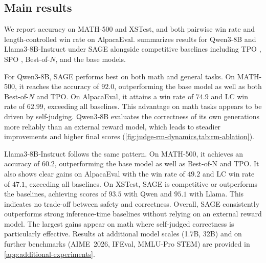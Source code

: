 \documentclass[11pt]{article}
\theoremstyle{plain}
\theoremstyle{definition}
\theoremstyle{remark}
\newcommand{\method}{SAGE}
\begin{document}
\subsection{Main results}
\noindent We report accuracy on MATH-500 and XSTest, and both pairwise win rate and length-controlled win rate on AlpacaEval.  summarizes results for Qwen3-8B and Llama3-8B-Instruct under \method{} alongside competitive baselines including TPO \citep{litest}, SPO \citep{xiang2025self}, Best-of-\(N\), and the base models.

For Qwen3-8B, \method{} performs best on both math and general tasks. On MATH-500, it reaches the accuracy of \(92.0\), outperforming the base model as well as both Best-of-\(N\) and TPO. On AlpacaEval, it attains a win rate of \(74.9\) and LC win rate of \(62.99\), exceeding all baselines.  This advantage on math tasks appears to be driven by self-judging. Qwen3‑8B evaluates the correctness of its own generations more reliably than an external reward model, which leads to steadier improvements and higher final scores (\cref{fig:judge-rm-dynamics,tab:rm-ablation}).

Llama3‑8B‑Instruct follows the same pattern. On MATH-500, it achieves an accuracy of \(60.2\), outperforming the base model as well as Best-of-N and TPO. It also shows clear gains on AlpacaEval with the win rate of \(49.2\) and LC win rate of \(47.1\), exceeding all baselines. On XSTest, \method{} is competitive or outperforms the baselines, achieving scores of \(93.5\) with Qwen and \(95.1\) with Llama. This indicates no trade‑off between safety and correctness. Overall, \method{} consistently outperforms strong inference‑time baselines without relying on an external reward model. The largest gains appear on math where self‑judged correctness is particularly effective. Results at additional model scales (1.7B, 32B) and on further benchmarks (AIME~2026, IFEval, MMLU-Pro STEM) are provided in \cref{app:additional-experiments}.
\end{document}
